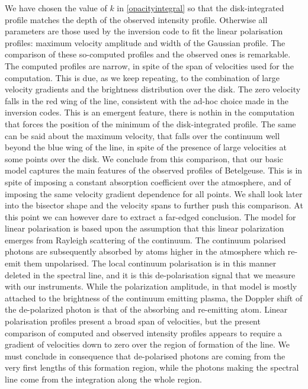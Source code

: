 \documentclass{/Users/art2/TeX/aanda/aa}
\begin{document}
We have chosen the value of $k$ in \ref{opacityintegral} so that the disk-integrated profile matches the depth of the observed 
intensity profile. Otherwise all parameters are those used by the inversion code to fit the linear polarisation profiles: maximum velocity amplitude and width of the Gaussian profile. The comparison of these so-computed profiles 
and the observed ones is remarkable. The computed profiles are narrow, in spite of the span of velocities used for the computation. This 
is due, as we keep repeating, to the combination of large velocity gradients and the brightness distribution over the disk. The zero velocity
falls in the red wing of the line, consistent with the ad-hoc choice made in the inversion codes. This is an emergent feature, there is 
nothin in the computation that forces the position of the minimum of the disk-integrated profile. The same can be said about the 
maximum velocity, that falls over the continuum well beyond the blue wing of the line, in spite of the presence of large velocities 
at some points over the disk. We conclude from this comparison, that our basic model captures the main features of the observed profiles 
of Betelgeuse. This is in spite of imposing a constant absorption coefficient over the atmosphere, and of imposing the same velocity 
gradient dependence for all points.  We shall look later into the bisector shape and the velocity spans to further push this comparison. 
At this point we can however dare to extract a far-edged conclusion. The model for linear polarisation is based upon the assumption that 
this linear polarization emerges from Rayleigh scattering of the continuum. The continuum polarised photons are subsequently absorbed 
by atoms higher in the atmosphere which re-emit them unpolarised. The local continuum polarisation is in this manner deleted in the spectral line, and it is 
this de-polarisation signal that we measure with our instruments. While the polarization amplitude, in that model is mostly attached 
to the brightness of the continuum emitting plasma, the Doppler shift of the de-polarized photon is that of the absorbing and re-emitting atom. 
Linear polarisation profiles present a broad span  of velocities, but the present comparison of computed and observed intensity 
profiles appears to require a gradient of velocities down to zero over the region of formation of the line. We must conclude 
in consequence that de-polarised photons are coming from the very first lengths of this formation region, while the photons making 
the spectral line come from the integration along the whole region.
\end{document}
